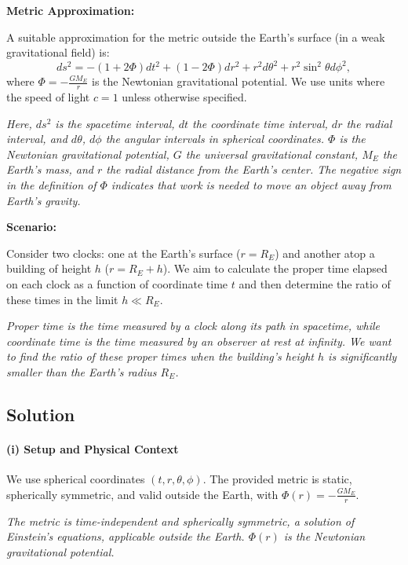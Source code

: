     \textbf{Metric Approximation:}

    A suitable approximation for the metric outside the Earth's surface (in a weak gravitational field) is:
    \[
        ds^2 = -\left(1+2\Phi\right)dt^2 + \left(1-2\Phi\right)dr^2 + r^2d\theta^2 + r^2\sin^2\theta d\phi^2,
    \]
    where $\Phi = -\frac{GM_E}{r}$ is the Newtonian gravitational potential. We use units where the speed of light $c=1$ unless otherwise specified.

    \textit{Here, $ds^2$ is the spacetime interval, $dt$ the coordinate time interval, $dr$ the radial interval, and $d\theta$, $d\phi$ the angular intervals in spherical coordinates. $\Phi$ is the Newtonian gravitational potential, $G$ the universal gravitational constant, $M_E$ the Earth's mass, and $r$ the radial distance from the Earth's center. The negative sign in the definition of $\Phi$ indicates that work is needed to move an object away from Earth's gravity.}

    \textbf{Scenario:}

    Consider two clocks: one at the Earth's surface ($r = R_E$) and another atop a building of height $h$ ($r = R_E + h$). We aim to calculate the proper time elapsed on each clock as a function of coordinate time $t$ and then determine the ratio of these times in the limit $h \ll R_E$.

    \textit{Proper time is the time measured by a clock along its path in spacetime, while coordinate time is the time measured by an observer at rest at infinity. We want to find the ratio of these proper times when the building's height $h$ is significantly smaller than the Earth's radius $R_E$.}

    \subsection*{Solution}

    \paragraph{(i) Setup and Physical Context}

    We use spherical coordinates $(t, r, \theta, \phi)$. The provided metric is static, spherically symmetric, and valid outside the Earth, with $\Phi(r) = -\frac{GM_E}{r}$.

    \textit{The metric is time-independent and spherically symmetric, a solution of Einstein's equations, applicable outside the Earth. $\Phi(r)$ is the Newtonian gravitational potential.}

